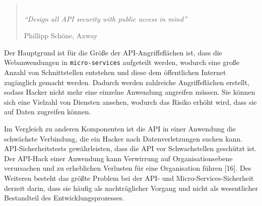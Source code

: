 \begin{quote}
	\emph{\\
		"`Design all API security with public access in mind"'}
	\begin{flushright}
		Phillipp Schöne, Axway
	\end{flushright}
\end{quote}

Der Hauptgrund ist für die Größe der API-Angriffsflächen ist, dass die Webanwendungen in \texttt{micro-services} aufgeteilt werden, wodurch eine große Anzahl von Schnittstellen entstehen und diese dem öffentlichen Internet zugänglich gemacht werden. Dadurch werden zahlreiche Angriffsflächen erstellt, sodass Hacker nicht mehr eine einzelne Anwendung angreifen müssen. Sie können sich eine Vielzahl von Diensten ansehen, wodurch das Risiko erhöht wird, dass sie auf Daten zugreifen können\cite{mswv17}. 

Im Vergleich zu anderen Komponenten ist die API in einer Anwendung die schwächste Verbindung, die ein Hacker nach Datenverletzungen suchen kann. API-Sicherheitstests gewährleisten, dass die API vor Schwachstellen geschützt ist. Der API-Hack einer Anwendung kann Verwirrung auf Organisationsebene verursachen und zu erheblichen Verlusten für eine Organisation führen [16]. Des Weiteren besteht das größte Problem bei der API- und Micro-Services-Sicherheit derzeit darin, dass sie häufig als nachträglicher Vorgang und nicht als wesentlicher Bestandteil des Entwicklungsprozesses\cite{anthonyart18}.

